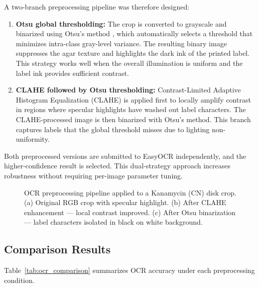 A two-branch preprocessing pipeline was therefore designed:

\begin{enumerate}
  \item \textbf{Otsu global thresholding:}
        The crop is converted to grayscale and binarized using Otsu's method \cite{humphries2018},
        which automatically selects a threshold that minimizes intra-class gray-level variance.
        The resulting binary image suppresses the agar texture and highlights the dark ink
        of the printed label.
        This strategy works well when the overall illumination is uniform
        and the label ink provides sufficient contrast.
  \item \textbf{CLAHE followed by Otsu thresholding:}
        Contrast-Limited Adaptive Histogram Equalization (CLAHE) is applied first
        to locally amplify contrast in regions where specular highlights have washed out
        label characters.
        The CLAHE-processed image is then binarized with Otsu's method.
        This branch captures labels that the global threshold misses
        due to lighting non-uniformity.
\end{enumerate}

Both preprocessed versions are submitted to EasyOCR independently,
and the higher-confidence result is selected.
This dual-strategy approach increases robustness without requiring per-image parameter tuning.

\begin{figure}[H]
  \centering
  \caption{OCR preprocessing pipeline applied to a Kanamycin (CN) disk crop.
           (a) Original RGB crop with specular highlight.
           (b) After CLAHE enhancement --- local contrast improved.
           (c) After Otsu binarization --- label characters isolated in black on white background.}
  \label{fig:ocr_pipeline}
\end{figure}

\subsection{Comparison Results}

Table~\ref{tab:ocr_comparison} summarizes OCR accuracy under each preprocessing condition.

